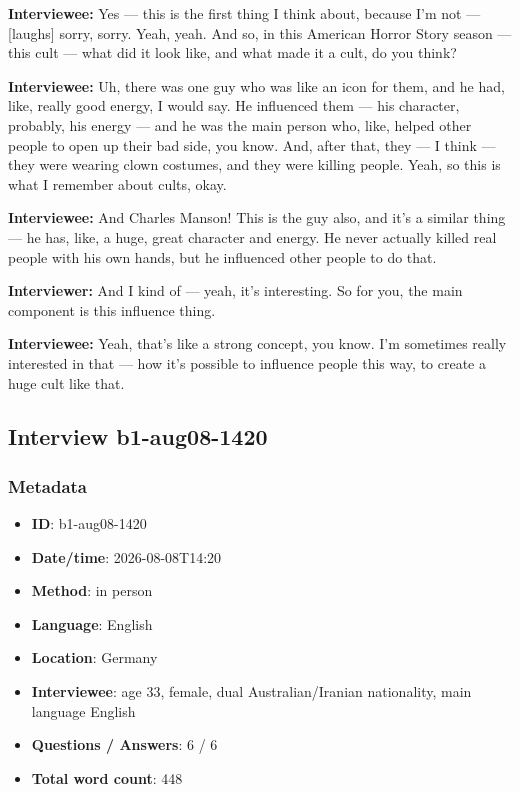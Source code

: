 \textbf{Interviewee:} Yes — this is the first thing I think about, because I'm not — [laughs] sorry, sorry. Yeah, yeah. And so, in this American Horror Story season — this cult — what did it look like, and what made it a cult, do you think?

\textbf{Interviewee:} Uh, there was one guy who was like an icon for them, and he had, like, really good energy, I would say. He influenced them — his character, probably, his energy — and he was the main person who, like, helped other people to open up their bad side, you know. And, after that, they — I think — they were wearing clown costumes, and they were killing people. Yeah, so this is what I remember about cults, okay.

\textbf{Interviewee:} And Charles Manson! This is the guy also, and it's a similar thing — he has, like, a huge, great character and energy. He never actually killed real people with his own hands, but he influenced other people to do that.

\textbf{Interviewer:} And I kind of — yeah, it's interesting. So for you, the main component is this influence thing.

\textbf{Interviewee:} Yeah, that's like a strong concept, you know. I'm sometimes really interested in that — how it's possible to influence people this way, to create a huge cult like that.

\subsection{Interview b1-aug08-1420}\label{int:b1-aug08-1420}
\subsubsection*{Metadata}
\begin{itemize}
  \item \textbf{ID}: b1-aug08-1420
  \item \textbf{Date/time}: 2026-08-08T14:20
  \item \textbf{Method}: in person
  \item \textbf{Language}: English
  \item \textbf{Location}: Germany
  \item \textbf{Interviewee}: age 33, female, dual Australian/Iranian nationality, main language English
  \item \textbf{Questions / Answers}: 6 / 6
  \item \textbf{Total word count}: 448
\end{itemize}
